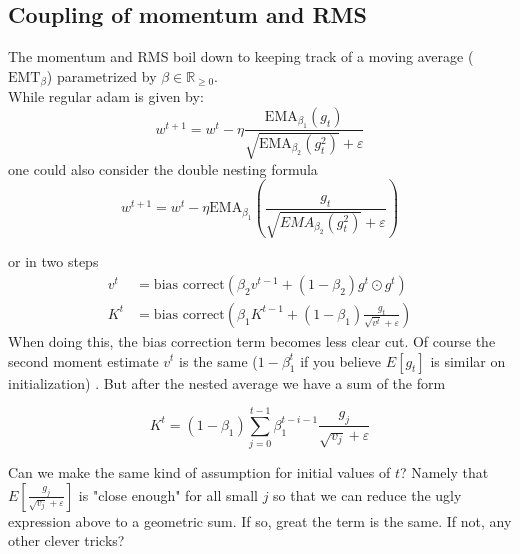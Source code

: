 \documentclass[12pt]{book}
\newcommand{\R}{\mathbb{R}}
\begin{document}
\subsection*{Coupling of momentum and RMS}
The momentum and RMS boil down to keeping track of a moving average ($\text{EMT}_{\beta}$) parametrized by $\beta\in \R_{\ge 0}$. 
\\
While regular adam is given by:
\[
w^{t+1} = w^{t} - \eta \frac{\text{EMA}_{\beta_1}(g_t)}{\sqrt{\text{EMA}_{\beta_2}(g_t ^2) } + \varepsilon  }
\] 
one could also consider the double nesting formula
\[
w^{t+1} = w^{t} - \eta \text{EMA}_{\beta_1} \left( \frac{g_t}{\sqrt{EMA_{\beta_2}(g_t^2)} + \varepsilon  } \right) 
\] 

or in two steps 
\begin{align*}
	v^{t} &= \text{bias correct}(\beta_2v^{t-1} + (1-\beta_2)g^{t}\odot g^{t})\\
	K^{t} &= \text{bias correct}(\beta_1K^{t-1} + (1-\beta_1) \frac{g_{t}}{\sqrt{v^{t}} + \varepsilon  })
\end{align*}
When doing this, the bias correction term becomes less clear cut. Of course the second moment estimate $v^{t}$ is the same ($1-\beta_1^{t} $ if you believe $E[g_t]$ is similar on initialization) . But after the nested average we have a sum of the form 

\[
	K^{t} = (1-\beta_1)\sum_{j=0}^{t-1} {\beta_1^{t-i-1} \frac{g_j}{\sqrt{v_j} + \varepsilon }}
\]

Can we make the same kind of assumption for initial values of $t$? Namely that $E[\frac{g_j}{\sqrt{v_j} + \varepsilon }]$ is "close enough" for all small $j$ so that we can reduce the ugly expression above to a geometric sum. If so, great the term is the same. If not, any other clever tricks? 
\end{document}
